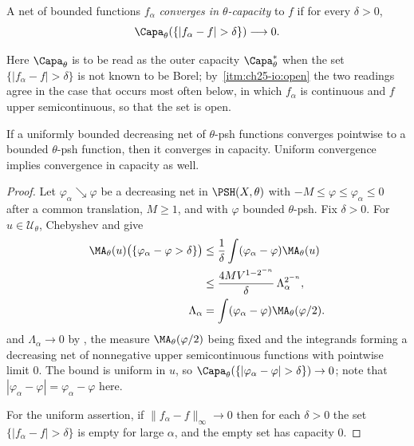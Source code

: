 \begin{definition}
\label{def:ch25-convergence-in-capacity}
A net of bounded functions \(f_\alpha\) \emph{converges in
\(\theta\)-capacity} to \(f\) if for every \(\delta>0\),
\[
             \Capa_\theta(\{|f_\alpha-f|>\delta\})\longrightarrow0.
\]
\end{definition}

Here \(\Capa_\theta\) is to be read as the outer capacity
\(\Capa^*_\theta\) when the set \(\{|f_\alpha-f|>\delta\}\) is not known to
be Borel; by \,\cref{itm:ch25-io:open} the two
readings agree in the case that occurs most often below, in which
\(f_\alpha\) is continuous and \(f\) upper semicontinuous, so that the set is
open.

\begin{proposition}
\label{prop:decreasing-capacity-convergence}
If a uniformly bounded decreasing net of \(\theta\)-psh functions converges
pointwise to a bounded \(\theta\)-psh function, then it converges in
capacity. Uniform convergence implies convergence in capacity as well.
\end{proposition}

\begin{proof}
Let \(\varphi_\alpha\searrow\varphi\) be a decreasing net in
\(\PSH(X,\theta)\) with \(-M\leq\varphi\leq\varphi_\alpha\leq0\) after a
common translation, \(M\geq1\), and with \(\varphi\) bounded
\(\theta\)-psh.  Fix \(\delta>0\).  For \(u\in\mathcal U_\theta\), Chebyshev
and  give
\[
 \begin{aligned}
 \MA_\theta(u)\bigl(\{\varphi_\alpha-\varphi>\delta\}\bigr)
 &\leq\frac1\delta\int(\varphi_\alpha-\varphi)\MA_\theta(u)\\
 &\leq\frac{4MV^{1-2^{-n}}}{\delta}\,\Lambda_\alpha^{2^{-n}},\\
 \Lambda_\alpha&=\int(\varphi_\alpha-\varphi)\MA_\theta(\varphi/2).
 \end{aligned}
\]
and \(\Lambda_\alpha\to0\) by , the
measure \(\MA_\theta(\varphi/2)\) being fixed and the integrands forming a
decreasing net of nonnegative upper semicontinuous functions with pointwise
limit \(0\).  The bound is uniform in \(u\), so
\(\Capa_\theta(\{|\varphi_\alpha-\varphi|>\delta\})\to0\); note that
\(|\varphi_\alpha-\varphi|=\varphi_\alpha-\varphi\) here.

For the uniform assertion, if \(\|f_\alpha-f\|_\infty\to0\) then for each
\(\delta>0\) the set \(\{|f_\alpha-f|>\delta\}\) is empty for large
\(\alpha\), and the empty set has capacity \(0\).
\end{proof}

